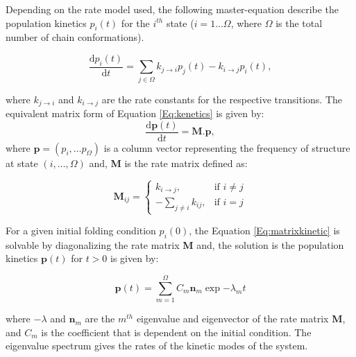 Depending on the rate model used, the following master-equation describe the population kinetics $p_i(t)$ for the $i^{th}$ state ($i=1\dots \Omega$, where $\Omega$ is the total number of chain conformations).

\begin{equation}
\label{Eq:kenetics}
\frac{\text{d}p_i(t)}{\text{d}t} = \sum\limits_{j \in \Omega}
k_{j \rightarrow i} p_{j}(t) - k_{i \rightarrow j} p_{i}(t),
\end{equation}

where $k_{j\rightarrow i}$ and $k_{i \rightarrow j}$ are the rate constants for the respective transitions. The equivalent matrix form of Equation \ref{Eq:kenetics} is given by: 
\begin{equation}
\label{Eq:matrixkinetic}
	\frac{\text{d}\textbf{p}(t)}{\text{d}t} = \textbf{M} . \textbf{p},
\end{equation}
where $\textbf{p} = (p_i, \dots p_{\Omega})$ is a column vector representing the frequency of structure at state $(i, \dots , \Omega)$ and, \textbf{M} is the rate matrix defined as: 

\begin{equation}
	\textbf{M}_{ij} =  \begin{cases}
	k_{i\rightarrow j},& \text{if } i\neq j\\
	- \sum_{j\neq i}{k_{ij}},              & \text{if } i=j
	\end{cases}
\end{equation}

For a given initial folding condition $p_i(0)$, the Equation \ref{Eq:matrixkinetic} is solvable by diagonalizing the rate matrix \textbf{M} and, the solution is the population kinetics $\textbf{p}(t)$ for $t>0$ is given by: 

\begin{equation}
	\label{Eq:solutionkinetics}
	\textbf{p}(t) = \sum_{m=1}^{\Omega} {C_m \textbf{n}_m \exp{-\lambda_m t}}
\end{equation}

where $-\lambda$ and $\textbf{n}_m$ are the $m^{th}$ eigenvalue and eigenvector of the rate matrix \textbf{M}, and $C_m$ is the coefficient that is dependent on the initial condition. The eigenvalue spectrum gives the rates of the kinetic modes of the system.


